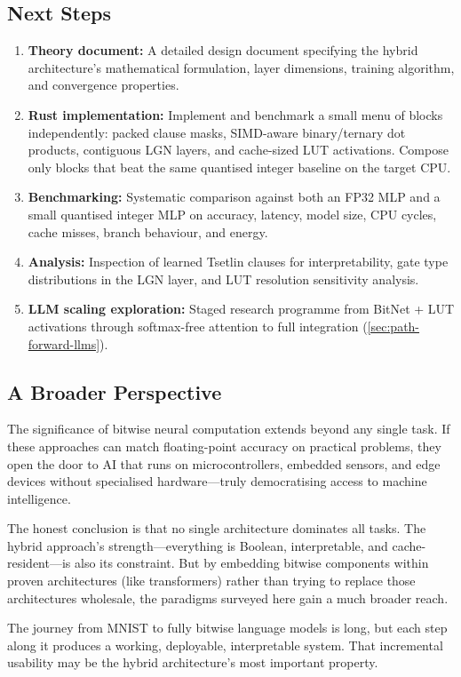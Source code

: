 \subsection{Next Steps}

\begin{enumerate}[leftmargin=2em]
  \item \textbf{Theory document:} A detailed design document
    specifying the hybrid architecture's mathematical formulation,
    layer dimensions, training algorithm, and convergence properties.

  \item \textbf{Rust implementation:} Implement and benchmark a small
    menu of blocks independently: packed clause masks, SIMD-aware
    binary/ternary dot products, contiguous LGN layers, and cache-sized
    LUT activations. Compose only blocks that beat the same quantised
    integer baseline on the target CPU.

  \item \textbf{Benchmarking:} Systematic comparison against both an
    FP32 MLP and a small quantised integer MLP on accuracy, latency,
    model size, CPU cycles, cache misses, branch behaviour, and energy.

  \item \textbf{Analysis:} Inspection of learned Tsetlin clauses
    for interpretability, gate type distributions in the LGN layer,
    and LUT resolution sensitivity analysis.

  \item \textbf{LLM scaling exploration:} Staged research programme
    from BitNet + LUT activations through softmax-free attention
    to full integration (\cref{sec:path-forward-llms}).
\end{enumerate}

\subsection{A Broader Perspective}

The significance of bitwise neural computation extends beyond any
single task. If these approaches can match floating-point accuracy on
practical problems, they open the door to AI that runs on
microcontrollers, embedded sensors, and edge devices without
specialised hardware---truly democratising access to machine
intelligence.

The honest conclusion is that no single architecture dominates all
tasks. The hybrid approach's strength---everything is Boolean,
interpretable, and cache-resident---is also its constraint. But by
embedding bitwise components within proven architectures (like
transformers) rather than trying to replace those architectures
wholesale, the paradigms surveyed here gain a much broader reach.

The journey from MNIST to fully bitwise language models is long,
but each step along it produces a working, deployable, interpretable
system. That incremental usability may be the hybrid architecture's
most important property.
